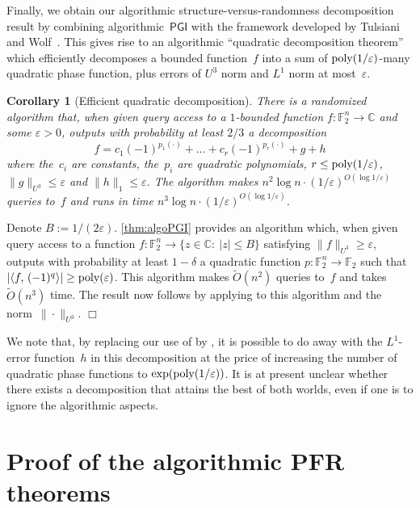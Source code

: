 \documentclass[11pt]{amsart}
\newcommand{\C}{\mathbb{C}} %
\newcommand{\F}{\mathbb{F}} %
\newcommand{\PGI}{\textsf{PGI}}
\newcommand{\eps}{\varepsilon}
\newcommand{\poly}{\mbox{\rm poly}}
\theoremstyle{plain}
\newtheorem{corollary}[theorem]{Corollary}
\theoremstyle{definition}
\theoremstyle{remark}
\renewenvironment{proof}[1][]{
    	\begin{trivlist}
     	\item[\hspace{\labelsep}{\em\noindent Proof#1:\/}]}
     	{{\hfill$\Box$}
    	\end{trivlist}
  }
\begin{document}
Finally, we obtain our algorithmic structure-versus-randomness decomposition result by combining algorithmic~$\PGI$ with the framework developed by Tulsiani and Wolf~\cite{TulsianiW2014}.
This gives rise to an algorithmic ``quadratic decomposition theorem'' which efficiently decomposes a bounded function~$f$ into a sum of $\poly(1/\eps)$-many quadratic phase function, plus errors of $U^3$ norm and $L^1$ norm at most~$\eps$.

\begin{corollary}[Efficient quadratic decomposition] \label{cor:decomposition}
    There is a randomized algorithm that, when given query access to a $1$-bounded function $f: \F_2^n \to \C$ and some $\eps>0$, outputs with probability at least $2/3$ a decomposition
    $$f = c_1 (-1)^{p_1(\cdot)} + \dots + c_r (-1)^{p_r(\cdot)} + g + h$$
    where the~$c_i$ are constants, the~$p_i$ are quadratic polynomials, $r \leq \poly(1/\eps)$, $\|g\|_{U^3} \leq \eps$ and $\|h\|_1 \leq \eps$.
    The algorithm makes $n^2 \log n\cdot (1/\eps)^{O(\log 1/\eps)}$ queries to~$f$ and runs in time $n^3 \log n\cdot (1/\eps)^{O(\log 1/\eps)}$.
\end{corollary}

\begin{proof}
Denote $B := 1/(2\eps)$.
\cref{thm:algoPGI} provides an algorithm which, when given query access to a function $f: \F_2^n \to \{z\in \C:\: |z| \leq B\}$ satisfying $\|f\|_{U^3} \geq \eps$, outputs with probability at least $1-\delta$ a quadratic function $p: \F_2^n \to \F_2$ such that $|\langle f,\, (-1)^{q}\rangle| \geq \poly(\eps)$.
This algorithm makes $\widetilde{O}(n^2)$ queries to~$f$ and takes $\widetilde{O}(n^3)$ time.
The result now follows by applying \cite[Theorem~3.1]{TulsianiW2014} to this algorithm and the norm~$\|\cdot\|_{U^3}$.
\end{proof}

We note that, by replacing our use of \cite[Theorem~3.1]{TulsianiW2014} by \cite[Theorem~3.3]{kim2023cubic}, it is possible to do away with the $L^1$-error function~$h$ in this decomposition at the price of increasing the number of quadratic phase functions to $\exp(\poly(1/\eps))$.
It is at present unclear whether there exists a decomposition that attains the best of both worlds, even if one is to ignore the algorithmic aspects.


\section{Proof of the algorithmic PFR theorems} \label{sec:algo_PFR}
\end{document}
